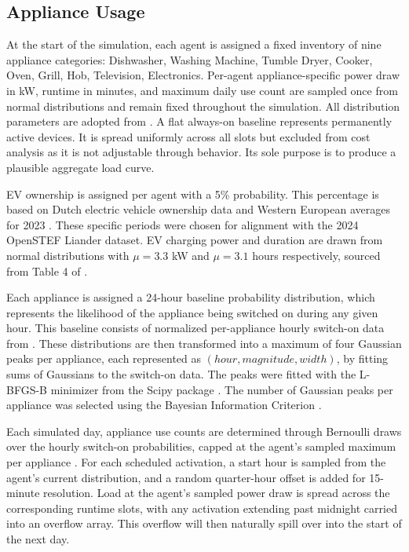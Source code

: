 \documentclass[11pt, a4paper]{article}
\begin{document}
\subsection{Appliance Usage} \label{subs:usage}

At the start of the simulation, each agent is assigned a fixed inventory of nine appliance categories: Dishwasher, Washing Machine, Tumble Dryer, Cooker, Oven, Grill, Hob, Television, Electronics. Per-agent appliance-specific power draw in kW, runtime in minutes, and maximum daily use count are sampled once from normal distributions and remain fixed throughout the simulation. All distribution parameters are adopted from \textcite{williams_residential_2025}. A flat always-on baseline represents permanently active devices. It is spread uniformly across all slots but excluded from cost analysis as it is not adjustable through behavior. Its sole purpose is to produce a plausible aggregate load curve. 

EV ownership is assigned per agent with a 5\% probability. This percentage is based on Dutch electric vehicle ownership data \autocite{rvo_stand_2026} and Western European averages for 2023 \autocite{eurostat_nordic_2025}. These specific periods were chosen for alignment with the 2024 OpenSTEF Liander dataset. EV charging power and duration are drawn from normal distributions with $\mu = 3.3$ kW and $\mu = 3.1$ hours respectively, sourced from Table 4 of \textcite{robinson_analysis_2013}.

Each appliance is assigned a 24-hour baseline probability distribution, which represents the likelihood of the appliance being switched on during any given hour. This baseline consists of normalized per-appliance hourly switch-on data from \textcite{yilmaz_occupant_2017}. These distributions are then transformed into a maximum of four Gaussian peaks per appliance, each represented as $(\mathit{hour}, \mathit{magnitude}, \mathit{width})$, by fitting sums of Gaussians to the switch-on data. The peaks were fitted with the L-BFGS-B minimizer from the Scipy package \autocite{virtanen_scipy_2020}. The number of Gaussian peaks per appliance was selected using the Bayesian Information Criterion \autocite{schwarz_estimating_1978}. 

Each simulated day, appliance use counts are determined through Bernoulli draws over the \textcite{yilmaz_occupant_2017} hourly switch-on probabilities, capped at the agent's sampled maximum per appliance \autocite{williams_residential_2025}. For each scheduled activation, a start hour is sampled from the agent's current distribution, and a random quarter-hour offset is added for 15-minute resolution. Load at the agent's sampled power draw is spread across the corresponding runtime slots, with any activation extending past midnight carried into an overflow array. This overflow will then naturally spill over into the start of the next day. 
\end{document}
